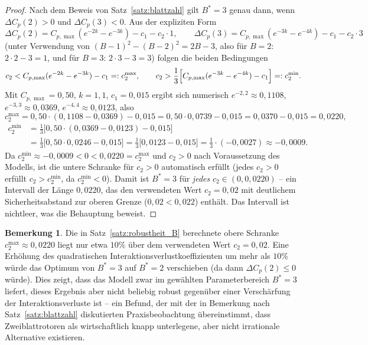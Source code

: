﻿\documentclass[a4paper,12pt]{article}
\theoremstyle{definition}
\newtheorem{bemerkung}{Bemerkung}
\begin{document}
\begin{proof}
Nach dem Beweis von Satz~\ref{satz:blattzahl} gilt $B^*=3$ genau dann, wenn $\Delta C_p(2)>0$ und $\Delta C_p(3)<0$. Aus der expliziten Form
\[
\Delta C_p(2) = C_{p,\max}\left(e^{-2k}-e^{-3k}\right) - c_1 - c_2\cdot 1, \qquad
\Delta C_p(3) = C_{p,\max}\left(e^{-3k}-e^{-4k}\right) - c_1 - c_2\cdot 3
\]
(unter Verwendung von $(B-1)^2-(B-2)^2 = 2B-3$, also für $B=2$: $2\cdot2-3=1$, und für $B=3$: $2\cdot3-3=3$) folgen die beiden Bedingungen
\[
c_2 < C_{p,\max}(e^{-2k}-e^{-3k}) - c_1 =: c_2^{\max}, \qquad
c_2 > \frac{1}{3}\Bigl[C_{p,\max}(e^{-3k}-e^{-4k}) - c_1\Bigr] =: c_2^{\min}.
\]
Mit $C_{p,\max}=0{,}50$, $k=1{,}1$, $c_1=0{,}015$ ergibt sich numerisch $e^{-2{,}2}\approx0{,}1108$, $e^{-3{,}3}\approx0{,}0369$, $e^{-4{,}4}\approx0{,}0123$, also
\[
c_2^{\max} = 0{,}50\cdot(0{,}1108-0{,}0369) - 0{,}015 = 0{,}50\cdot0{,}0739-0{,}015 = 0{,}0370-0{,}015 = 0{,}0220,
\]
\begin{align*}
c_2^{\min} &= \tfrac{1}{3}\bigl[0{,}50\cdot(0{,}0369-0{,}0123)-0{,}015\bigr] \\
&= \tfrac{1}{3}\bigl[0{,}50\cdot0{,}0246-0{,}015\bigr] = \tfrac{1}{3}\bigl[0{,}0123-0{,}015\bigr] = \tfrac{1}{3}\cdot(-0{,}0027) \approx -0{,}0009.
\end{align*}
Da $c_2^{\min}\approx-0{,}0009 < 0 < 0{,}0220 = c_2^{\max}$ und $c_2>0$ nach Voraussetzung des Modells, ist die untere Schranke für $c_2>0$ automatisch erfüllt (jedes $c_2>0$ erfüllt $c_2>c_2^{\min}$, da $c_2^{\min}<0$). Damit ist $B^*=3$ für \emph{jedes} $c_2\in(0, 0{,}0220)$ -- ein Intervall der Länge $0{,}0220$, das den verwendeten Wert $c_2=0{,}02$ mit deutlichem Sicherheitsabstand zur oberen Grenze ($0{,}02<0{,}022$) enthält. Das Intervall ist nichtleer, was die Behauptung beweist. \qedhere
\end{proof}

\begin{bemerkung}
Die in Satz~\ref{satz:robustheit_B} berechnete obere Schranke $c_2^{\max}\approx0{,}0220$ liegt nur etwa $10\%$ über dem verwendeten Wert $c_2=0{,}02$. Eine Erhöhung des quadratischen Interaktionsverlustkoeffizienten um mehr als $10\%$ würde das Optimum von $B^*=3$ auf $B^*=2$ verschieben (da dann $\Delta C_p(2)\le0$ würde). Dies zeigt, dass das Modell zwar im gewählten Parameterbereich $B^*=3$ liefert, dieses Ergebnis aber nicht beliebig robust gegenüber einer Verschärfung der Interaktionsverluste ist -- ein Befund, der mit der in Bemerkung nach Satz~\ref{satz:blattzahl} diskutierten Praxisbeobachtung übereinstimmt, dass Zweiblattrotoren als wirtschaftlich knapp unterlegene, aber nicht irrationale Alternative existieren.
\end{bemerkung}
\end{document}
